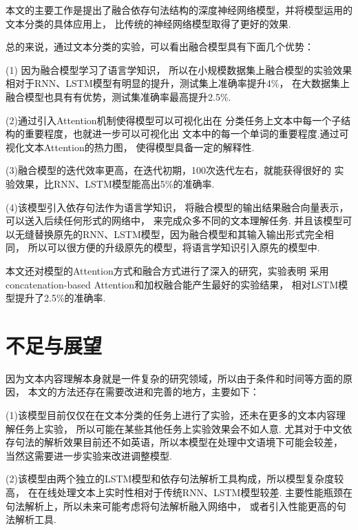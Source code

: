 \documentclass[bachelor,winfonts]{jnuthesis}
\begin{document}
本文的主要工作是提出了融合依存句法结构的深度神经网络模型，并将模型运用的文本分类的具体应用上，
比传统的神经网络模型取得了更好的效果.

总的来说，通过文本分类的实验，可以看出融合模型具有下面几个优势：

(1) 因为融合模型学习了语言学知识，
所以在小规模数据集上融合模型的实验效果相对于RNN、LSTM模型有明显的提升，测试集上准确率提升4\%，
在大数据集上融合模型也具有有优势，测试集准确率最高提升2.5\%.

(2)通过引入Attention机制使得模型可以可视化出在
分类任务上文本中每一个子结构的重要程度，也就进一步可以可视化出
文本中的每一个单词的重要程度.通过可视化文本Attention的热力图，
使得模型具备一定的解释性.

(3)融合模型的迭代效率更高，在迭代初期，100次迭代左右，就能获得很好的
实验效果，比RNN、LSTM模型能高出5\%的准确率.

(4)该模型引入依存句法作为语言学知识，
将融合模型的输出结果融合向量表示，可以送入后续任何形式的网络中，
来完成众多不同的文本理解任务.
并且该模型可以无缝替换原先的RNN、LSTM模型，因为融合模型和其输入输出形式完全相同，
所以可以很方便的升级原先的模型，将语言学知识引入原先的模型中.

本文还对模型的Attention方式和融合方式进行了深入的研究，实验表明
采用concatenation-based Attention和加权融合能产生最好的实验结果，
相对LSTM模型提升了2.5\%的准确率.

\section{不足与展望}
因为文本内容理解本身就是一件复杂的研究领域，所以由于条件和时间等方面的原因，
本文的方法还存在需要改进和完善的地方，主要如下：

(1)该模型目前仅仅在在文本分类的任务上进行了实验，还未在更多的文本内容理解任务上实验，
所以可能在某些其他任务上实验效果会不如人意.
尤其对于中文依存句法的解析效果目前还不如英语，所以本模型在处理中文语境下可能会较差，
当然这需要进一步实验来改进调整模型.

(2)该模型由两个独立的LSTM模型和依存句法解析工具构成，所以模型复杂度较高，
在在线处理文本上实时性相对于传统RNN、LSTM模型较差.
主要性能瓶颈在句法解析上，所以未来可能考虑将句法解析融入网络中，
或者引入性能更高的句法解析工具.


\nocite{*}

%
%

\begin{acknowledgement}
  
\end{acknowledgement}

\backmatter




\end{document}
